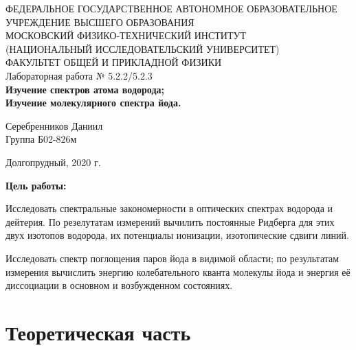 \documentclass[a4paper,12pt]{article} %
\begin{document}
\begin{center}
	\footnotesize{ФЕДЕРАЛЬНОЕ ГОСУДАРСТВЕННОЕ АВТОНОМНОЕ ОБРАЗОВАТЕЛЬНОЕ 			УЧРЕЖДЕНИЕ ВЫСШЕГО ОБРАЗОВАНИЯ}\\
	\footnotesize{МОСКОВСКИЙ ФИЗИКО-ТЕХНИЧЕСКИЙ ИНСТИТУТ\\(НАЦИОНАЛЬНЫЙ 			ИССЛЕДОВАТЕЛЬСКИЙ УНИВЕРСИТЕТ)}\\
	\footnotesize{ФАКУЛЬТЕТ ОБЩЕЙ И ПРИКЛАДНОЙ ФИЗИКИ\\}
	\hfill \break
	\hfill\break
	\hfill\break
	\hfill \break
	\hfill \break
	\hfill \break
	\hfill \break
	\hfill \break
	\hfill \break
	\hfill \break
	\hfill \break
	\hfill \break
	\hfill \break
	\hfill \break
	\large{Лабораторная работа № 5.2.2/5.2.3 \\\textbf{Изучение спектров атома водорода;\\Изучение молекулярного спектра йода.}}\\
	\hfill \break
	\hfill \break
	\hfill \break
	\begin{flushright}
		Серебренников Даниил\\
		Группа Б02-826м
	\end{flushright}
	\hfill \break
	\hfill \break
	\hfill \break
	\hfill \break
	\hfill \break
	\hfill \break
	\hfill \break
	\hfill \break
	\hfill \break
	\hfill \break
	\hfill \break
\end{center}
\begin{center}
	Долгопрудный, 2020 г.
\end{center}
\thispagestyle{empty}
\newpage
	{\textbf{Цель работы:}}
	
	Исследовать спектральные закономерности в оптических спектрах водорода и дейтерия. По резелутатам измерений вычилить постоянные Ридберга для этих двух изотопов водорода, их потенциалы ионизации, изотопические сдвиги линий.
	
	Исследовать спектр поглощения паров йода в видимой области; по результатам измерения вычислить энергию колебательного кванта молекулы йода и энергия её диссоциации в основном и возбужденном состояниях.
\section{Теоретическая часть}
\end{document}
